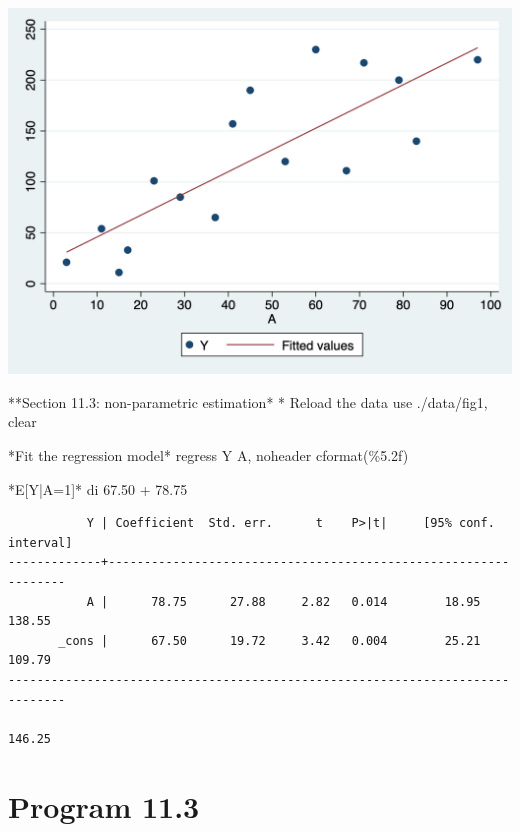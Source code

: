 \documentclass[
  10pt,
  a4paper,
]{book}
\newenvironment{Shaded}{\begin{snugshade}}{\end{snugshade}}
\newcommand{\KeywordTok}[1]{\textcolor[rgb]{0.00,0.46,0.62}{#1}}
\newcommand{\NormalTok}[1]{\textcolor[rgb]{0.00,0.46,0.62}{#1}}
\begin{document}
\begin{center}\includegraphics[width=0.85\linewidth]{figs/stata-fig-11-4} \end{center}

\begin{Shaded}
\begin{Highlighting}[]
\NormalTok{**Section 11.3: non{-}parametric estimation*}
\NormalTok{* Reload the }\KeywordTok{data}
\KeywordTok{use}\NormalTok{ ./}\KeywordTok{data}\NormalTok{/fig1, }\KeywordTok{clear}

\NormalTok{*Fit the regression }\KeywordTok{model}\NormalTok{*}
\KeywordTok{regress}\NormalTok{ Y A, }\KeywordTok{noheader}\NormalTok{ cformat(\%5.2f)}

\NormalTok{*E[Y|A=1]*}
\KeywordTok{di}\NormalTok{ 67.50 + 78.75}
\end{Highlighting}
\end{Shaded}

\begin{verbatim}
           Y | Coefficient  Std. err.      t    P>|t|     [95% conf. interval]
-------------+----------------------------------------------------------------
           A |      78.75      27.88     2.82   0.014        18.95      138.55
       _cons |      67.50      19.72     3.42   0.004        25.21      109.79
------------------------------------------------------------------------------

146.25
\end{verbatim}

\hypertarget{program-11.3-1}{%
\section{Program 11.3}\label{program-11.3-1}}
\end{document}
